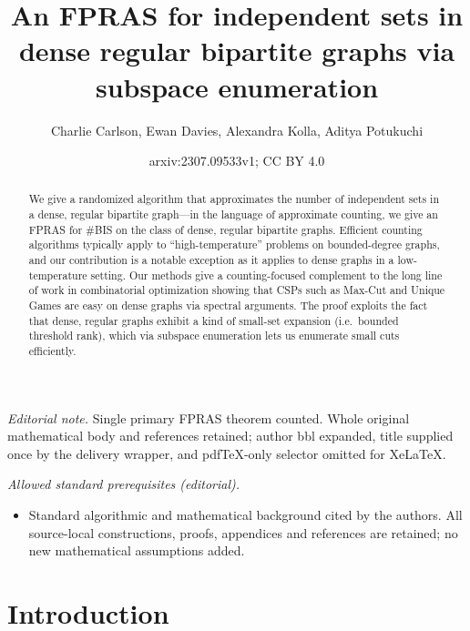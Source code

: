 \documentclass[11pt,letterpaper]{amsart}
\title{An FPRAS for independent sets in dense regular bipartite graphs via subspace enumeration}
\author{Charlie Carlson, Ewan Davies, Alexandra Kolla, Aditya Potukuchi}
\date{arxiv:2307.09533v1; CC BY 4.0}
\theoremstyle{definition}
\begin{document}
\maketitle
\noindent\textit{Editorial note.} Single primary FPRAS theorem counted. Whole original mathematical body and references retained; author bbl expanded, title supplied once by the delivery wrapper, and pdfTeX-only selector omitted for XeLaTeX.\par\medskip
\noindent\textit{Allowed standard prerequisites (editorial).}\begin{itemize}
\item Standard algorithmic and mathematical background cited by the authors. All source-local constructions, proofs, appendices and references are retained; no new mathematical assumptions added.
\end{itemize}\medskip
\begin{abstract}
We give a randomized algorithm that approximates the number of independent sets in a dense, regular bipartite graph---in the language of approximate counting, we give an FPRAS for \#BIS on the class of dense, regular bipartite graphs. 
Efficient counting algorithms typically apply to ``high-temperature'' problems on bounded-degree graphs, and our contribution is a notable exception as it applies to dense graphs in a low-temperature setting. 
Our methods give a counting-focused complement to the long line of work in combinatorial optimization showing that CSPs such as Max-Cut and Unique Games are easy on dense graphs via spectral arguments. The proof exploits the fact that dense, regular graphs exhibit a kind of small-set expansion (i.e.\ bounded threshold rank), which via subspace enumeration lets us enumerate small cuts efficiently.
\end{abstract}


\section{Introduction}
\end{document}
